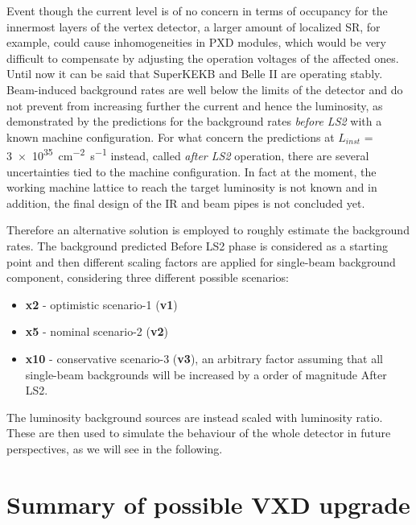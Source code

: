 Event though the current level is of no concern in terms of occupancy for the innermost layers of the vertex detector, a larger amount of localized SR, for example, could cause inhomogeneities in PXD modules, which would be very difficult to compensate by adjusting the operation voltages of the affected ones.\\

Until now it can be said that SuperKEKB and Belle II are operating stably. Beam-induced background rates are well below the limits of the detector and do not prevent from increasing further the current and hence the luminosity, as demonstrated by the predictions for the background rates \textit{before LS2} with a known machine configuration. 
For what concern the predictions at \textit{$L_{inst}$} = \SI{3e35}{cm^{-2}s^{-1}} instead, called \textit{after LS2} operation, there are several uncertainties tied to the machine configuration. In fact at the moment, the working machine lattice to reach the target luminosity is not known and in addition, the final design of the IR and beam pipes is not concluded yet.

Therefore an alternative solution is employed to roughly estimate the background rates. The background predicted Before LS2 phase is considered as a starting point and then different scaling factors are applied for single-beam background component, considering three different possible scenarios:

\begin{itemize}
\item \textbf{x2} - optimistic scenario-1 (\textbf{v1})
\item \textbf{x5} - nominal scenario-2 (\textbf{v2})
\item \textbf{x10} - conservative scenario-3 (\textbf{v3}), an arbitrary factor assuming that all single-beam backgrounds will be increased by a order of magnitude After LS2.
\end{itemize}

The luminosity background sources are instead scaled with luminosity ratio.
These are then used to simulate the behaviour of the whole detector in future perspectives, as we will see in the following.


\section{Summary of possible VXD upgrade} \label{sec:VTX_requirements}

